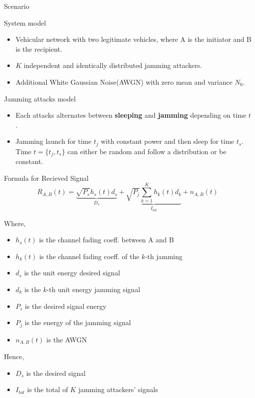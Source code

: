 \documentclass{beamer}
\providecommand{\brak}[1]{\ensuremath{\left(#1\right)}}
\providecommand{\cbrak}[1]{\ensuremath{\{#1\}}}
\begin{document}
\begin{frame}{Scenario}
\begin{block}{System model}
\begin{itemize}
    \item Vehicular network with two legitimate vehicles, where A is the initiator and B is the recipient.
    \item $K$ independent and identically distributed jamming attackers.
    \item Additional White Gaussian Noise(AWGN) with zero mean and variance $N_{0}$.
\end{itemize}
\end{block}
\begin{block}{Jamming attacks model}
\begin{itemize}
    \item Each attacks alternates between \textbf{sleeping} and \textbf{jamming} depending on time $t$.
    \item Jamming launch for time $t_{j}$ with constant power and then sleep for time $t_{s}$. Time $t=\cbrak{t_{j},t_{s}}$ can either be random and follow a distribution or be constant.
\end{itemize}
\end{block}
\end{frame}
\begin{frame}
\begin{block}{Formula for Recieved Signal}
    \begin{equation}
        R_{A,B}\brak{t}=\underbrace{\sqrt{P_{s}}h_{s}\brak{t}d_{s}}_{D_{s}} + \underbrace{\sqrt{P_{j}}\sum_{k=1}^{K}h_{k}\brak{t}d_{k}}_{I_{tot}} + n_{A,B}\brak{t}
    \end{equation}
    \end{block}
    Where,
    \begin{itemize}
        \item $h_{s}\brak{t}$ is the channel fading coeff. between A and B
        \item $h_{k}\brak{t}$ is the channel fading coeff. of the $k$-th jamming\
        \item $d_{s}$ is the unit energy desired signal
        \item $d_{k}$ is the $k$-th unit energy jamming signal
        \item $P_{s}$ is the desired signal energy
        \item $P_{j}$ is the energy of the jamming signal
        \item $n_{A,B}\brak{t}$ is the AWGN
    \end{itemize}
    Hence,
    \begin{itemize}
        \item $D_{s}$ is the desired signal
        \item $I_{tot}$ is the total of $K$ jamming attackers' signals
    \end{itemize}
\end{frame}
\end{document}
